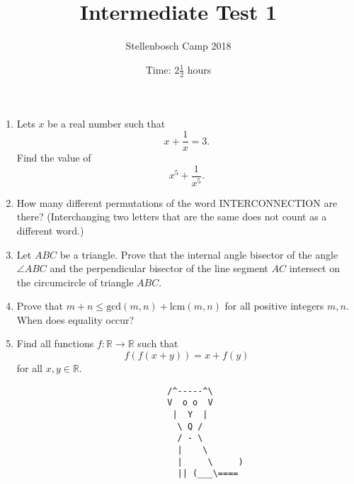 \documentclass{article}
\title{Intermediate Test 1}
\author{Stellenbosch Camp 2018}
\date{Time: $2\frac{1}{2}$ hours}
\begin{document}
\maketitle

\begin{enumerate}[1.]

\item %
Lets $x$ be a real number such that \[ x +\frac{1}{x} = 3. \] Find the value of \[ x^5 +\frac{1}{x^5}. \]

\vspace{12pt}
\item %
How many different permutations of the word INTERCONNECTION are there? (Interchanging two letters that are the same does not count as a different word.)

\vspace{12pt}
\item %
Let $ABC$ be a triangle. Prove that the internal angle bisector of the angle $\angle ABC$ and the perpendicular bisector of the line segment $AC$ intersect on the circumcircle of triangle $ABC$.

\vspace{12pt}
\item %
Prove that $m + n \leq \textrm{gcd}(m, n) + \textrm{lcm}(m, n)$ for all positive integers $m, n$. When does equality occur?

\vspace{12pt}
\item %
Find all functions $f : \mathbb{R} \to \mathbb{R}$ such that
$$ f(f(x+y)) = x + f(y) $$
for all $x, y \in \mathbb{R}$.

\end{enumerate}


\begin{center}
\begin{verbatim}
                                 /^-----^\
                                 V  o o  V
                                  |  Y  |
                                   \ Q /
                                   / - \
                                   |    \
                                   |     \     )
                                   || (___\====
\end{verbatim}
\end{center}
\end{document}
